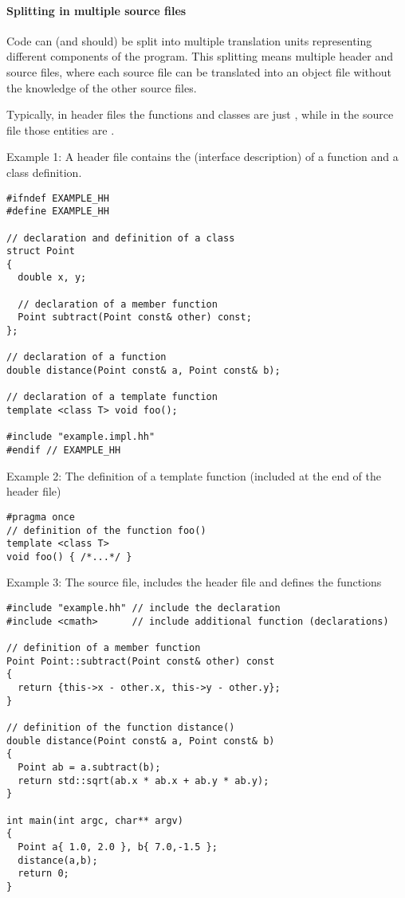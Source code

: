 \paragraph{Splitting in multiple source files}
Code can (and should) be split into multiple translation units representing different components of the program. This splitting means multiple header and source files, where each source file can be translated into an object file without the knowledge of the other source files.

Typically, in header files the functions and classes are just , while in the source file those entities are .

Example 1: A header file contains the  (interface description) of a function and a class definition.
\begin{verbatim}
#ifndef EXAMPLE_HH
#define EXAMPLE_HH

// declaration and definition of a class
struct Point
{
  double x, y;

  // declaration of a member function
  Point subtract(Point const& other) const;
};

// declaration of a function
double distance(Point const& a, Point const& b);

// declaration of a template function
template <class T> void foo();

#include "example.impl.hh"
#endif // EXAMPLE_HH
\end{verbatim}

Example 2: The definition of a template function (included at the end of the header file)

\begin{verbatim}
#pragma once
// definition of the function foo()
template <class T>
void foo() { /*...*/ }
\end{verbatim}

Example 3: The source file, includes the header file and defines the functions

\begin{verbatim}
#include "example.hh" // include the declaration
#include <cmath>      // include additional function (declarations)

// definition of a member function
Point Point::subtract(Point const& other) const
{
  return {this->x - other.x, this->y - other.y};
}

// definition of the function distance()
double distance(Point const& a, Point const& b)
{
  Point ab = a.subtract(b);
  return std::sqrt(ab.x * ab.x + ab.y * ab.y);
}

int main(int argc, char** argv)
{
  Point a{ 1.0, 2.0 }, b{ 7.0,-1.5 };
  distance(a,b);
  return 0;
}
\end{verbatim}


